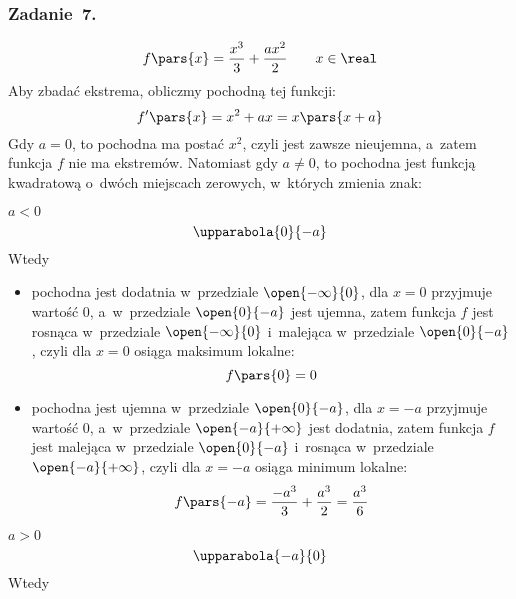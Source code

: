 \subsubsection*{Zadanie~7.}
\begin{equation*}
    f\pars{x} = \frac{x^3}{3} + \frac{ax^2}{2} \qquad x \in \real
\end{equation*}
Aby zbadać ekstrema, obliczmy pochodną tej funkcji:
\begin{equation*}
    f'\pars{x} = x^2 + ax = x\pars{x + a}
\end{equation*}
Gdy \(a = 0\), to pochodna ma postać \(x^2\), czyli jest zawsze nieujemna, a~zatem funkcja \(f\) nie ma ekstremów. Natomiast gdy \(a \neq 0\), to pochodna jest funkcją kwadratową o~dwóch miejscach zerowych, w~których zmienia znak:
\begin{proofcases}
    \item \(a < 0\)
        \begin{equation*}
            \upparabola{0}{-a}
        \end{equation*}
        Wtedy
            \begin{itemize}
                \item pochodna jest dodatnia w~przedziale \(\open{-\infty}{0}\), dla \(x = 0\) przyjmuje wartość \(0\), a~w~przedziale \(\open{0}{-a}\) jest ujemna, zatem funkcja \(f\) jest rosnąca w~przedziale \(\open{-\infty}{0}\) i~malejąca w~przedziale \(\open{0}{-a}\), czyli dla \(x = 0\) osiąga maksimum lokalne:
                    \begin{equation*}
                        f\pars{0} = 0
                    \end{equation*}
                \item pochodna jest ujemna w~przedziale \(\open{0}{-a}\), dla \(x = -a\) przyjmuje wartość \(0\), a~w~przedziale \(\open{-a}{+\infty}\) jest dodatnia, zatem funkcja \(f\) jest malejąca w~przedziale \(\open{0}{-a}\) i~rosnąca w~przedziale \(\open{-a}{+\infty}\), czyli dla \(x = -a\) osiąga minimum lokalne:
                \begin{equation*}
                    f\pars{-a} = \frac{-a^3}{3} + \frac{a^3}{2} = \frac{a^3}{6}
                \end{equation*}
            \end{itemize}
    \item \(a > 0\)
    \begin{equation*}
        \upparabola{-a}{0}
    \end{equation*}
    Wtedy
        \begin{itemize}

\end{itemize}
\end{proofcases}
